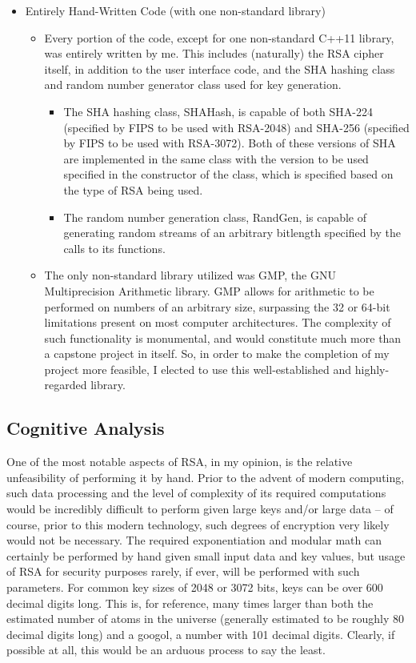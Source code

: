 \documentclass[11pt]{article}
\begin{document}
\begin{itemize}
{\begin{itemize}
{	}
	\end{itemize}
}
\item
{Entirely Hand-Written Code (with one non-standard library)
	\begin{itemize}
	\item
	{Every portion of the code, except for one non-standard C++11 library, was entirely written by me. This includes (naturally) the RSA cipher itself, in addition to the user interface code, and the SHA hashing class and random number generator class used for key generation.
		\begin{itemize}
		\item
		{The SHA hashing class, SHAHash, is capable of both SHA-224 (specified by FIPS to be used with RSA-2048) and SHA-256 (specified by FIPS to be used with RSA-3072). Both of these versions of SHA are implemented in the same class with the version to be used specified in the constructor of the class, which is specified based on the type of RSA being used.
		}
		\item
		{The random number generation class, RandGen, is capable of generating random streams of an arbitrary bitlength specified by the calls to its functions.
		}
		\end{itemize}
	}
	\item
	{The only non-standard library utilized was GMP, the GNU Multiprecision Arithmetic library. GMP allows for arithmetic to be performed on numbers of an arbitrary size, surpassing the 32 or 64-bit limitations present on most computer architectures. The complexity of such functionality is monumental, and would constitute much more than a capstone project in itself. So, in order to make the completion of my project more feasible, I elected to use this well-established and highly-regarded library.
	}
	\end{itemize}
}
\end{itemize}

\subsection{Cognitive Analysis}
One of the most notable aspects of RSA, in my opinion, is the relative unfeasibility of performing it by hand. Prior to the advent of modern computing, such data processing and the level of complexity of its required computations would be incredibly difficult to perform given large keys and/or large data -- of course, prior to this modern technology, such degrees of encryption very likely would not be necessary. The required exponentiation and modular math can certainly be performed by hand given small input data and key values, but usage of RSA for security purposes rarely, if ever, will be performed with such parameters. For common key sizes of 2048 or 3072 bits, keys can be over 600 decimal digits long. This is, for reference, many times larger than both the estimated number of atoms in the universe (generally estimated to be roughly 80 decimal digits long) and a googol, a number with 101 decimal digits. Clearly, if possible at all, this would be an arduous process to say the least.
\end{document}

